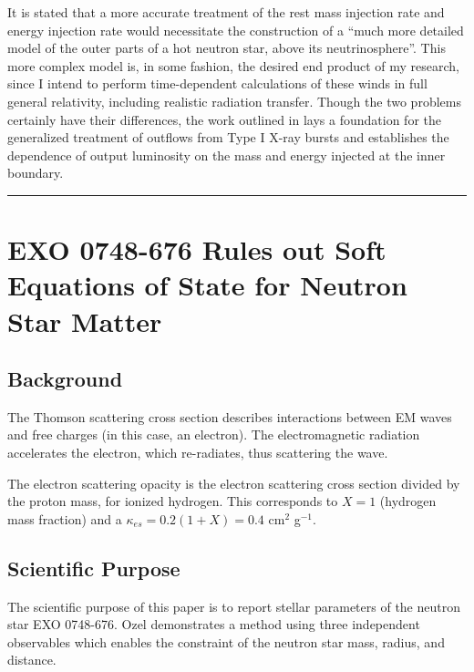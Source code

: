 \documentclass[onecolumn]{aastex63}
\begin{document}
It is stated that a more accurate treatment of the rest mass injection rate and energy injection rate would necessitate the construction of a ``much more detailed model of the outer parts of a hot neutron star, above its neutrinosphere''. This more complex model is, in some fashion, the desired end product of my research, since I intend to perform time-dependent calculations of these winds in full general relativity, including realistic radiation transfer. Though the two problems certainly have their differences, the work outlined in \cite{paczynski1990} lays a foundation for the generalized treatment of outflows from Type I X-ray bursts and establishes the dependence of output luminosity on the mass and energy injected at the inner boundary. 

\vspace{1cm}
\hrule
\vspace{1cm}

\section{EXO 0748-676 Rules out Soft Equations of State for Neutron Star Matter}
\begin{centering}

\cite{ozel2006}

\end{centering}


\subsection{Background}

The Thomson scattering cross section describes interactions between EM waves and free charges (in this case, an electron). The electromagnetic radiation accelerates the electron, which re-radiates, thus scattering the wave.  

The electron scattering opacity is the electron scattering cross section divided by the proton mass, for ionized hydrogen. This corresponds to $X = 1$ (hydrogen mass fraction) and a $\kappa_{es} = 0.2(1+X) = 0.4$ cm$^2$ g$^{-1}$.

\subsection{Scientific Purpose}

The scientific purpose of this paper is to report stellar parameters of the neutron star EXO 0748-676. Ozel demonstrates a method using three independent observables which enables the constraint of the neutron star mass, radius, and distance.
\end{document}
